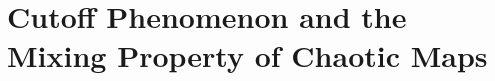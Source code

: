 \documentclass[twoside,10pt,final]{report}
\begin{document}
\chapter[Cutoffs and Symbolic Dynamics]{Cutoff Phenomenon and the Mixing Property of Chaotic Maps}




%
%




\appendix

%
%
%



%

\nocite{*}


     
    
\end{document}
